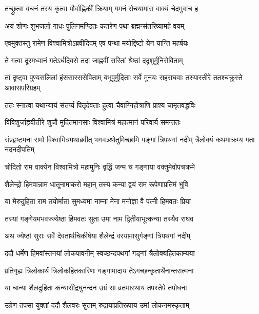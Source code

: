 \twolineshloka
{तच्छ्रुत्वा वचनं तस्य कृत्वा पौर्वाह्णिकीं क्रियाम्}
{गमनं रोचयामास वाक्यं चेदमुवाच ह} %

\twolineshloka
{अयं शोणः शुभजलो गाधः पुलिनमण्डितः}
{कतरेण पथा ब्रह्मन्संतरिष्यामहे वयम्} %

\twolineshloka
{एवमुक्तस्तु रामेण विश्वामित्रोऽब्रवीदिदम्}
{एष पन्था मयोद्दिष्टो येन यान्ति महर्षयः} %

\twolineshloka
{ते गत्वा दूरमध्वानं गतेऽर्धदिवसे तदा}
{जाह्नवीं सरितां श्रेष्ठां ददृशुर्मुनिसेविताम्} %

\threelineshloka
{तां दृष्ट्वा पुण्यसलिलां हंससारससेविताम्}
{बभूवुर्मुदिताः सर्वे मुनयः सहराघवाः}
{तस्यास्तीरे ततश्चक्रुस्ते आवासपरिग्रहम्} %

\twolineshloka
{ततः स्नात्वा यथान्यायं संतर्प्य पितृदेवताः}
{हुत्वा चैवाग्निहोत्राणि प्राश्य चामृतवद्धविः} %

\twolineshloka
{विविशुर्जाह्नवीतीरे शुचौ मुदितमानसाः}
{विश्वामित्रं महात्मानं परिवार्य समन्ततः} %

\threelineshloka
{संप्रहृष्टमना रामो विश्वामित्रमथाब्रवीत्}
{भगवञ्श्रोतुमिच्छामि गङ्गां त्रिपथगां नदीम्}
{त्रैलोक्यं कथमाक्रम्य गता नदनदीपतिम्} %

\twolineshloka
{चोदितो राम वाक्येन विश्वामित्रो महामुनिः}
{वृद्धिं जन्म च गङ्गाया वक्तुमेवोपचक्रमे} %

\twolineshloka
{शैलेन्द्रो हिमवान्नाम धातूनामाकरो महान्}
{तस्य कन्या द्वयं राम रूपेणाप्रतिमं भुवि} %

\twolineshloka
{या मेरुदुहिता राम तयोर्माता सुमध्यमा}
{नाम्ना मेना मनोज्ञा वै पत्नी हिमवतः प्रिया} %

\twolineshloka
{तस्यां गङ्गेयमभवज्ज्येष्ठा हिमवतः सुता}
{उमा नाम द्वितीयाभूत्कन्या तस्यैव राघव} %

\twolineshloka
{अथ ज्येष्ठां सुराः सर्वे देवतार्थचिकीर्षया}
{शैलेन्द्रं वरयामासुर्गङ्गां त्रिपथगां नदीम्} %

\twolineshloka
{ददौ धर्मेण हिमवांस्तनयां लोकपावनीम्}
{स्वच्छन्दपथगां गङ्गां त्रैलोक्यहितकाम्यया} %

\twolineshloka
{प्रतिगृह्य त्रिलोकार्थं त्रिलोकहितकारिणः}
{गङ्गामादाय तेऽगच्छन्कृतार्थेनान्तरात्मना} %

\twolineshloka
{या चान्या शैलदुहिता कन्यासीद्रघुनन्दन}
{उग्रं सा व्रतमास्थाय तपस्तेपे तपोधना} %

\twolineshloka
{उग्रेण तपसा युक्तां ददौ शैलवरः सुताम्}
{रुद्रायाप्रतिरूपाय उमां लोकनमस्कृताम्} %

